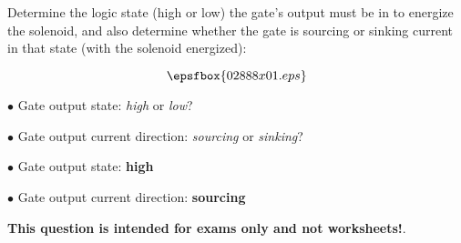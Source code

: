 

Determine the logic state (high or low) the gate's output must be in to energize the solenoid, and also determine whether the gate is sourcing or sinking current in that state (with the solenoid energized):

$$\epsfbox{02888x01.eps}$$

\medskip
\item{$\bullet$} Gate output state: {\it high} or {\it low}?
\item{$\bullet$} Gate output current direction: {\it sourcing} or {\it sinking}?
\medskip







\medskip
\item{$\bullet$} Gate output state: {\bf high}
\item{$\bullet$} Gate output current direction: {\bf sourcing}
\medskip







{\bf This question is intended for exams only and not worksheets!}.




